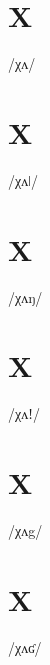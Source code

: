 \documentclass[10pt,a4paper,twoside]{book}
\begin{document}
\section*{X}

\begin{multicols}{3}
 {/χʌ/} {}
\end{multicols}

\section*{X}

\begin{multicols}{3}
 {/χʌǀ/} {}
\end{multicols}

\section*{X}

\begin{multicols}{3}
 {/χʌŋ/} {}
\end{multicols}

\section*{X}

\begin{multicols}{3}
 {/χʌǃ/} {}
\end{multicols}

\section*{X}

\begin{multicols}{3}
 {/χʌg/} {}
\end{multicols}

\section*{X}

\begin{multicols}{3}
 {/χʌʛ/} {}
\end{multicols}
\end{document}
